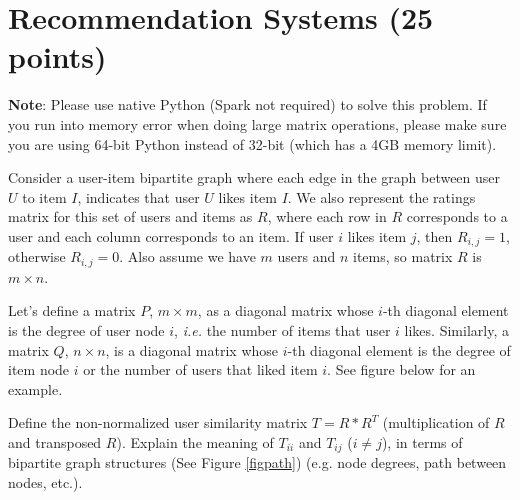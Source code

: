 \section{Recommendation Systems (25 points)}

\newcommand{\itt}[1]{\textnormal{item}_{#1}}
\newcommand{\user}[1]{\textnormal{user}_{#1}}
\newcommand{\cossim}{\operatorname{cos-sim}}
\newcommand{\argmin}{\operatornamewithlimits{argmin}}
\newcommand{\argmax}{\operatornamewithlimits{argmax}}

\textbf{Note}: Please use native Python (Spark not required) to solve this problem. If you run into memory error when doing large matrix operations, please make sure you are using 64-bit Python instead of 32-bit (which has a 4GB memory limit). 
\begin{center}
	{\footnotesize {} \hspace{1em}  \hspace{1em} }
\end{center}


Consider a user-item bipartite graph where each edge in the graph between user $U$
to item $I$, indicates that user $U$ likes item $I$. We also represent the ratings
matrix for this set of users and items as $R$, where each row in $R$ corresponds to a user and each column corresponds to an item. If user $i$ likes
item $j$, then $R_{i,j}=1$, otherwise $R_{i,j}=0$. Also assume we have $m$ users
and $n$ items, so matrix $R$ is $m \times n$.

Let's define a matrix $P$, $m \times m$, as a diagonal matrix whose $i$-th diagonal
element is the degree of user node $i$, \emph{i.e.} the number of items that user $i$ likes. Similarly, a matrix $Q$, $n \times n$, is a diagonal matrix whose $i$-th
diagonal element is the degree of item node $i$ or the number of users that
liked item $i$. See figure below for an example.


 Define the non-normalized user similarity matrix $T = R*R^T$ (multiplication of $R$ and transposed $R$). Explain the meaning of $T_{ii}$ and $T_{ij}$ ($i \neq j$), in terms of bipartite graph structures (See Figure \ref{figpath}) (e.g. node degrees, path between nodes, etc.).

